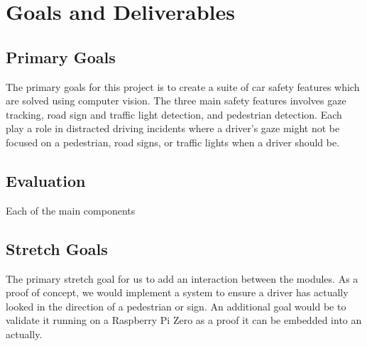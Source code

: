 \section{Goals and Deliverables}

\subsection{Primary Goals}

The primary goals for this project is to create a suite of car safety features which are solved using computer vision.
The three main safety features involves gaze tracking, road sign and traffic light detection, and pedestrian detection.
Each play a role in distracted driving incidents where a driver's gaze might not be focused on a pedestrian, road signs, or traffic lights when a driver should be.

\subsection{Evaluation}

Each of the main components 

\subsection{Stretch Goals}

The primary stretch goal for us to add an interaction between the modules.
As a proof of concept, we would implement a system to ensure a driver has actually looked in the direction of a pedestrian or sign.
An additional goal would be to validate it running on a Raspberry Pi Zero as a proof it can be embedded into an actually.